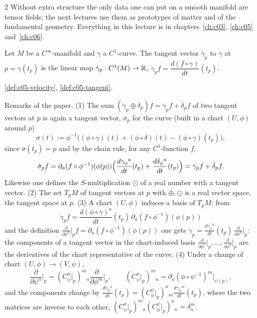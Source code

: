 \begin{paracol}{2}
 Without extra structure the only data one can put on a smooth manifold are tensor fields; the next lectures use them as prototypes of matter and of the fundamental geometry. Everything in this lecture is in chapters~\ref{ch:c03}, \ref{ch:c05} and~\ref{ch:c06}.

\begin{definition}\label{def:c29-tangent}
Let $M$ be a $C^\infty$-manifold and $\gamma$ a $C^1$-curve. The tangent vector $\dot\gamma_p$ to $\gamma$ at $p=\gamma(t_p)$ is the linear map $\dot\gamma_p:C^1(M)\to\mathbb{R}$, $\dot\gamma_pf=\dfrac{d(f\circ\gamma)}{dt}(t_p)$.
\end{definition}
\begin{recall}
\cref{def:c05-velocity}, \cref{def:c05-tangent}.
\end{recall}

Remarks of the paper. (1) The sum $(\dot\gamma_p\oplus\dot\delta_p)f=\dot\gamma_pf+\dot\delta_pf$ of two tangent vectors at $p$ is again a tangent vector, $\dot\sigma_p$ for the curve (built in a chart $(U,\phi)$ around $p$)
\[
  \sigma(t):=\phi^{-1}\bigl((\phi\circ\gamma)(t)+(\phi\circ\delta)(t)-(\phi\circ\gamma)(t_p)\bigr),
\]
since $\sigma(t_p)=p$ and by the chain rule, for any $C^1$-function $f$,
\[
  \dot\sigma_pf=\partial_a(f\circ\phi^{-1})(\phi(p))\Bigl(\frac{d\gamma_\phi{}^a}{dt}(t_p)+\frac{d\delta_\phi{}^a}{dt}(t_p)\Bigr)=\dot\gamma_pf+\dot\delta_pf.
\]
Likewise one defines the $S$-multiplication $\odot$ of a real number with a tangent vector. (2) The set $T_pM$ of tangent vectors at $p$ with $\oplus,\odot$ is a real vector space, the tangent space at $p$. (3) A chart $(U,\phi)$ induces a basis of $T_pM$: from
\[
  \dot\gamma_pf=\frac{d(\phi\circ\gamma)^a}{dt}(t_p)\,\partial_a(f\circ\phi^{-1})(\phi(p))
\]
and the definition $\frac{\partial}{\partial\phi^a}\big|_pf=\partial_a(f\circ\phi^{-1})(\phi(p))$ one gets $\dot\gamma_p=\frac{d\gamma_\phi{}^a}{dt}(t_p)\,\frac{\partial}{\partial\phi^a}\big|_p$: the components of a tangent vector in the chart-induced basis $\frac{\partial}{\partial\phi^1}\big|_p,\dots,\frac{\partial}{\partial\phi^d}\big|_p$ are the derivatives of the chart representative of the curve. (4) Under a change of chart $(U,\phi)\to(V,\psi)$,
\[
  \frac{\partial}{\partial\psi^a}\Big|_p=(C^\phi_\psi|_p)^m{}_a\frac{\partial}{\partial\phi^m}\Big|_p,\qquad (C^\phi_\psi|_p)^m{}_a=\partial_a(\phi\circ\psi^{-1})^m\big|_{\psi(p)},
\]
and the components change by $\frac{d\gamma_\psi{}^a}{dt}(t_p)=(C^\psi_\phi|_p)^a{}_m\frac{d\gamma_\phi{}^m}{dt}(t_p)$, where the two matrices are inverse to each other, $(C^\phi_\psi|_p)^m{}_a(C^\psi_\phi|_p)^a{}_n=\delta^m_n$.


\end{paracol}
